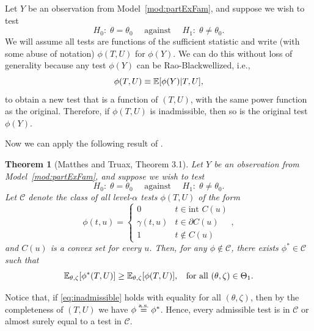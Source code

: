\documentclass{article}
\newtheorem{theorem}{Theorem}
\theoremstyle{definition}
\newcommand{\sC}{\mathscr{C}}
\begin{document}
Let $Y$ be an observation from Model~\ref{mod:partExFam}, and suppose we wish to test
 \begin{equation}\label{eq:hypEq}
  H_0:\;\theta=\theta_0 \quad \text{ against }
  \quad H_1:\; \theta\neq \theta_0.
\end{equation}
We will assume all tests are functions of the sufficient statistic and write (with some abuse of notation) $\phi(T, U)$ for $\phi(Y)$. We can do this without loss of generality because any test $\phi(Y)$ can be Rao-Blackwellized, i.e.,
\[ \phi(T, U) \equiv \mathbb{E}[\phi(Y) | T, U], \]
to obtain a new test that is a function of $(T, U)$, with the same power function as the original. Therefore, if $\phi(T, U)$ is inadmissible, then so is the original test $\phi(Y)$.

Now we can apply the following result of \citet{matthes1967tests}.

\begin{theorem}[Matthes and Truax, Theorem 3.1]
Let $Y$ be an observation from Model~\ref{mod:partExFam}, and suppose we wish to test
 \begin{equation}\label{eq:hypEq}
  H_0:\;\theta=\theta_0 \quad \text{ against }
  \quad H_1:\; \theta\neq \theta_0.
\end{equation}
 Let $\sC$ denote the class of all level-$\alpha$ tests $\phi(T, U)$ of the form
 \begin{equation}\label{eq:convexU}
   \phi(t, u) = \begin{cases}
       0 & t \in \text{int } C(u) \\
       \gamma(t, u) & t \in \partial C(u)\\
       1 & t \notin C(u)
     \end{cases},
 \end{equation}
and $C(u)$ is a convex set for every $u$. Then, for any $\phi \notin \sC$, there exists $\phi^* \in \sC$ such that
\begin{equation}
  \mathbb{E}_{\theta,\zeta}[\phi^*(T, U)] \geq \mathbb{E}_{\theta,\zeta}[\phi(T, U)], \;\;\text{ for all } (\theta,\zeta)\in \Theta_1.
 \label{eq:inadmissible}
\end{equation}
\label{thm:matthes}
\end{theorem}

Notice that, if \eqref{eq:inadmissible} holds with equality for all $(\theta, \zeta)$, then by the completeness of $(T,U)$ we have $\phi \overset{\textrm{a.s.}}{=} \phi^*$. Hence, every admissible test is in $\sC$ or almost surely equal to a test in $\sC$.
\end{document}
